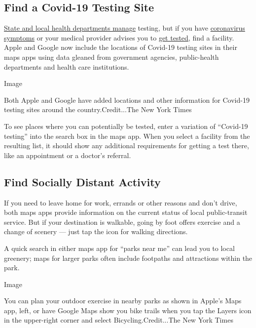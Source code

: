 \hypertarget{find-a-covid-19-testing-site}{%
\subsection{Find a Covid-19 Testing
Site}\label{find-a-covid-19-testing-site}}

\href{https://www.cdc.gov/coronavirus/2019-ncov/symptoms-testing/testing.html}{State
and local health departments manage} testing, but if you have
\href{https://www.cdc.gov/coronavirus/2019-ncov/symptoms-testing/symptoms.html}{coronavirus
symptoms} or your medical provider advises you to
\href{https://www.cdc.gov/coronavirus/2019-ncov/lab/testing.html}{get
tested}, find a facility. Apple and Google now include the locations of
Covid-19 testing sites in their maps apps using data gleaned from
government agencies, public-health departments and health care
institutions.

Image

Both Apple and Google have added locations and other information for
Covid-19 testing sites around the country.Credit...The New York Times

To see places where you can potentially be tested, enter a variation of
``Covid-19 testing'' into the search box in the maps app. When you
select a facility from the resulting list, it should show any additional
requirements for getting a test there, like an appointment or a doctor's
referral.

\hypertarget{find-socially-distant-activity}{%
\subsection{Find Socially Distant
Activity}\label{find-socially-distant-activity}}

If you need to leave home for work, errands or other reasons and don't
drive, both maps apps provide information on the current status of local
public-transit service. But if your destination is walkable, going by
foot offers exercise and a change of scenery --- just tap the icon for
walking directions.

A quick search in either maps app for ``parks near me'' can lead you to
local greenery; maps for larger parks often include footpaths and
attractions within the park.

Image

You can plan your outdoor exercise in nearby parks as shown in Apple's
Maps app, left, or have Google Maps show you bike trails when you tap
the Layers icon in the upper-right corner and select
Bicycling.Credit...The New York Times

